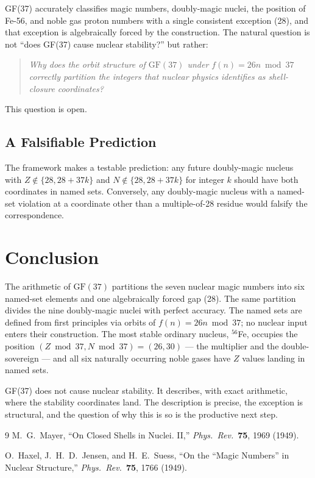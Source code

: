 \documentclass[11pt]{article}
\theoremstyle{remark}
\begin{document}
GF(37) accurately classifies magic numbers, doubly-magic nuclei, the position of
Fe-56, and noble gas proton numbers with a single consistent exception (28), and that
exception is algebraically forced by the construction. The natural question is not
``does GF(37) cause nuclear stability?'' but rather:

\begin{quote}
\emph{Why does the orbit structure of $\mathrm{GF}(37)$ under $f(n)=26n\bmod 37$
correctly partition the integers that nuclear physics identifies as shell-closure
coordinates?}
\end{quote}

This question is open.

\subsection{A Falsifiable Prediction}

The framework makes a testable prediction: any future doubly-magic nucleus with
$Z\notin\{28,28+37k\}$ and $N\notin\{28,28+37k\}$ for integer $k$ should have
both coordinates in named sets. Conversely, any doubly-magic nucleus with a
named-set violation at a coordinate other than a multiple-of-28 residue would
falsify the correspondence.

\section{Conclusion}

The arithmetic of $\mathrm{GF}(37)$ partitions the seven nuclear magic numbers into
six named-set elements and one algebraically forced gap (28). The same partition
divides the nine doubly-magic nuclei with perfect accuracy. The named sets are defined
from first principles via orbits of $f(n)=26n\bmod 37$; no nuclear input enters their
construction. The most stable ordinary nucleus, ${}^{56}$Fe, occupies the position
$(Z\bmod 37, N\bmod 37)=(26,30)$ --- the multiplier and the double-sovereign --- and
all six naturally occurring noble gases have $Z$ values landing in named sets.

GF(37) does not cause nuclear stability. It describes, with exact arithmetic, where the
stability coordinates land. The description is precise, the exception is structural, and
the question of why this is so is the productive next step.

\begin{thebibliography}{9}
M.~G.~Mayer, ``On Closed Shells in Nuclei. II,''
\textit{Phys.\ Rev.}\ \textbf{75}, 1969 (1949).

O.~Haxel, J.~H.~D.~Jensen, and H.~E.~Suess,
``On the ``Magic Numbers'' in Nuclear Structure,''
\textit{Phys.\ Rev.}\ \textbf{75}, 1766 (1949).
\end{thebibliography}
\end{document}
